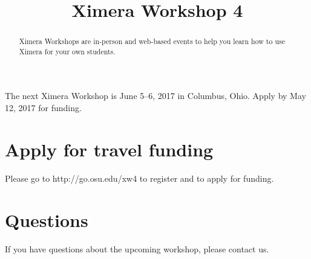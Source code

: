 \documentclass{ximera}
\title{Ximera Workshop 4}
\begin{document}
\begin{abstract}
  Ximera Workshops are in-person and web-based events to help you learn how to use Ximera for your own students.
\end{abstract}
\maketitle

The next Ximera Workshop is June 5--6, 2017 in Columbus, Ohio.  Apply by May 12, 2017 for funding.

\section{Apply for travel funding}

Please go to http://go.osu.edu/xw4 to register and to apply for funding.
       
\section{Questions}

If you have questions about the upcoming workshop, please contact us.
\end{document}
